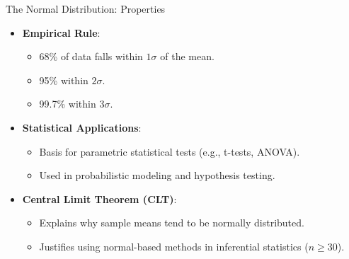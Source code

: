 \documentclass[aspectratio=169,xcolor=dvipsnames]{beamer}
\begin{document}
\begin{frame}{The Normal Distribution: Properties}
\begin{itemize}
    \setlength\itemsep{0.25cm}
    \item \textbf{Empirical Rule}:
    \begin{itemize}
        \item 68\% of data falls within $1\sigma$ of the mean.
        \item 95\% within $2\sigma$.
        \item 99.7\% within $3\sigma$.
    \end{itemize}
    \item \textbf{Statistical Applications}:
    \begin{itemize}
        \item Basis for parametric statistical tests (e.g., t-tests, ANOVA).
        \item Used in probabilistic modeling and hypothesis testing.
    \end{itemize}
    \item \textbf{Central Limit Theorem (CLT)}:
    \begin{itemize}
        \item Explains why sample means tend to be normally distributed.
        \item Justifies using normal-based methods in inferential statistics ($n\geq30$).
    \end{itemize}
\end{itemize}
\end{frame}
\end{document}
